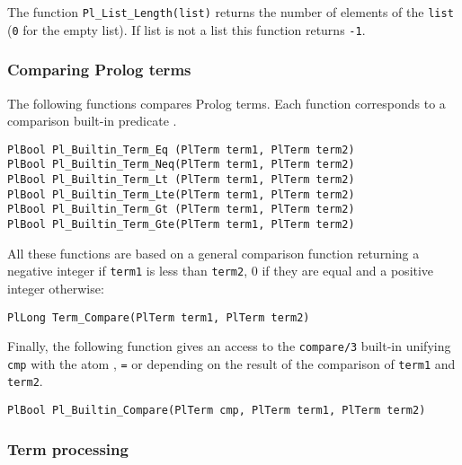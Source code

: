 The function \texttt{Pl\_List\_Length(list)} returns the number of elements of
the \texttt{list} (\texttt{0} for the empty list). If list is not a list
this function returns \texttt{-1}.

\subsubsection{Comparing Prolog terms}

The following functions compares Prolog terms. Each function corresponds to
a comparison built-in predicate .

\begin{Indentation}
\begin{verbatim}
PlBool Pl_Builtin_Term_Eq (PlTerm term1, PlTerm term2)
PlBool Pl_Builtin_Term_Neq(PlTerm term1, PlTerm term2)
PlBool Pl_Builtin_Term_Lt (PlTerm term1, PlTerm term2)
PlBool Pl_Builtin_Term_Lte(PlTerm term1, PlTerm term2)
PlBool Pl_Builtin_Term_Gt (PlTerm term1, PlTerm term2)
PlBool Pl_Builtin_Term_Gte(PlTerm term1, PlTerm term2)
\end{verbatim}
\end{Indentation}

All these functions are based on a general comparison function returning a
negative integer if \texttt{term1} is less than \texttt{term2}, 0 if they
are equal and a positive integer otherwise:

\begin{Indentation}
\begin{verbatim}
PlLong Term_Compare(PlTerm term1, PlTerm term2)
\end{verbatim}
\end{Indentation}

Finally, the following function gives an access to the \texttt{compare/3}
built-in  unifying \texttt{cmp} with the
atom \texttt{{\lt}}, \texttt{=} or \texttt{{\gt}} depending on the result of
the comparison of \texttt{term1} and \texttt{term2}.

\begin{Indentation}
\begin{verbatim}
PlBool Pl_Builtin_Compare(PlTerm cmp, PlTerm term1, PlTerm term2)
\end{verbatim}
\end{Indentation}


\subsubsection{Term processing}

